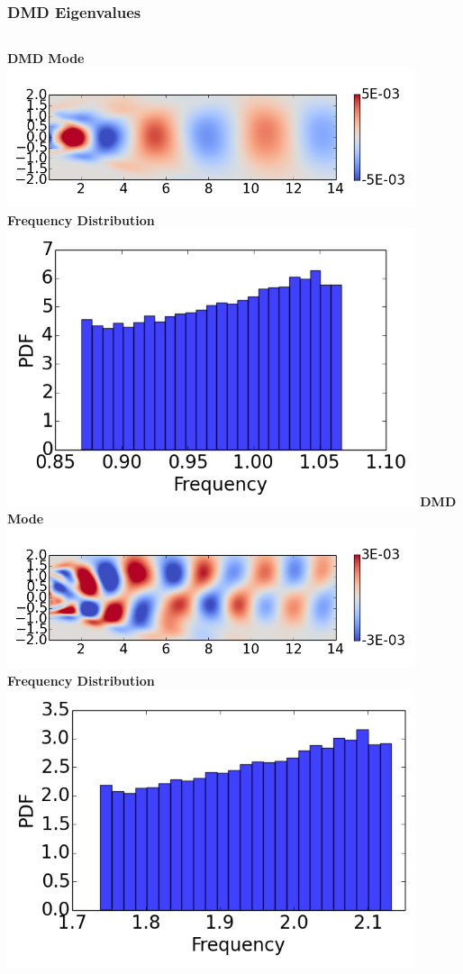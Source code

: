 \documentclass[9pt]{beamer}
\begin{document}
\begin{frame}
\frametitle{DMD Eigenvalues}
\label{sec-3-7}

\begin{columns}[c]
   \centering
    \textbf{DMD Mode} \\
    \includegraphics[width=0.9\textwidth]{DMDMode1} \\
    \textbf{Frequency Distribution} \\
    \includegraphics[width=0.9\textwidth]{PerturbDMDEigSlowPDF}
   \centering
    \textbf{DMD Mode} \\
    \includegraphics[width=0.9\textwidth]{DMDMode2} \\
    \textbf{Frequency Distribution} \\
    \includegraphics[width=0.9\textwidth]{PerturbDMDEigMediumPDF}

\end{columns}
\end{frame}
\end{document}
